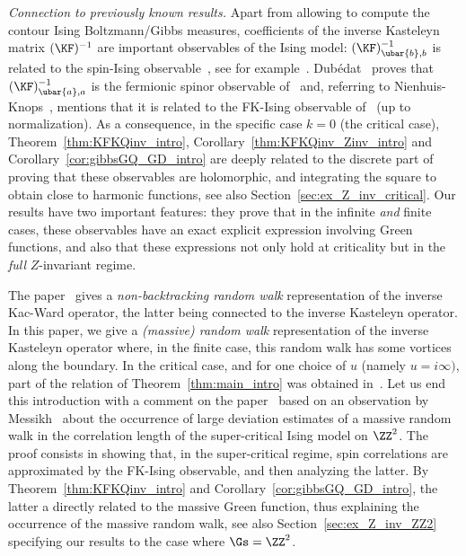 \documentclass[a4paper,twoside,11pt]{article}
\begin{document}
\emph{Connection to previously known results.} 
Apart from allowing to compute the contour Ising Boltzmann/Gibbs measures,
coefficients of the inverse Kasteleyn matrix $(\KF)^{-1}$ are important observables of the Ising model:
$(\KF)^{-1}_{\ubar{b},b}$ is related to the spin-Ising observable~\cite{ChelkakSmirnov:ising}, see for example~\cite{CCK}. 
Dub\'edat~\cite{Dubedat} proves that $(\KF)^{-1}_{\ubar{a},a}$ is the fermionic spinor observable of~\cite{KadanoffCeva} and,
referring to Nienhuis-Knops~\cite{NK}, mentions that it 
is related to the FK-Ising observable of~\cite{Smirnov3} (up to normalization). As a consequence, 
in the specific case $k=0$ (the critical case),
Theorem~\ref{thm:KFKQinv_intro}, Corollary~\ref{thm:KFKQinv_Zinv_intro} and Corollary~\ref{cor:gibbsGQ_GD_intro} 
 are deeply related to the discrete part of~\cite{ChelkakSmirnov:ising} proving that these
observables are holomorphic, and integrating the square to obtain close to harmonic functions, see also Section~\ref{sec:ex_Z_inv_critical}.
Our results have two important features: they prove that in the infinite \emph{and} finite cases, these observables have an exact explicit expression 
involving Green functions, and also that these expressions not only hold at criticality but in the \emph{full} $Z$-invariant regime.

The paper~\cite{Lis2} gives a \emph{non-backtracking random walk} representation of the inverse Kac-Ward operator, the latter being 
connected to the inverse Kasteleyn operator. In this paper, we give a \emph{(massive) random walk} representation of the inverse Kasteleyn 
operator where, in the finite case, this random walk has some vortices along the boundary. In the critical case, and for one choice of $u$ 
(namely $u=i\infty)$, part of the relation of Theorem~\ref{thm:main_intro} was obtained in~\cite{Cimasoni:KacWard2}. 
Let us end this introduction with a comment on the paper~\cite{BeffaraDuminil} based on an observation by Messikh~\cite{Messikh}
about the occurrence of large deviation estimates of a massive random walk in the correlation length of the super-critical Ising model on $\ZZ^2$. The proof 
consists in showing that, in the super-critical regime, spin correlations are approximated by the FK-Ising observable, and then analyzing 
the latter. By Theorem~\ref{thm:KFKQinv_intro} and Corollary~\ref{cor:gibbsGQ_GD_intro}, the latter a directly related to the massive 
Green function, thus explaining the occurrence of the massive random walk, see also Section~\ref{sec:ex_Z_inv_ZZ2} specifying our results 
to the case where $\Gs=\ZZ^2$.
\end{document}
